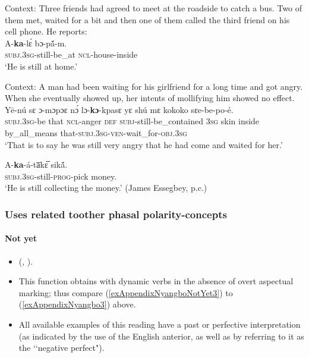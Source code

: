 \begin{exe}
	\ex\label{exAppendixNyangbo1}
	Context: Three friends had agreed to meet at the roadside to catch a bus. Two of them met, waited for a bit and then one of them called the third friend on his cell phone. He reports:\\
	\gll A-\textbf{ka}-lɛ́ bɔ-pã́-m.\\
	\textsc{subj}.3\textsc{sg}-still-be\_at \textsc{ncl}-house-inside\\
	\glt \lq He is still at home.’ \parencite[46]{Essegbey2012}

	\ex\label{exAppendixNyangbo2}
	Context: A man had been waiting for his girlfriend for a long time and got angry. When she eventually showed up, her intents of mollifying him showed no effect. \\
	\gll Yē-nú sɛ ɔ-mɔpɔɛ nɔ́ lɔ-\textbf{kɔ}-kpasɛ yɛ shú mɛ kokoko sɛe-be-po-é.\\
	\textsc{subj}.3\textsc{sg}-be that \textsc{ncl}-anger \textsc{def} \textsc{subj}-still-be\_contained 3\textsc{sg} skin inside by\_all\_means that-\textsc{subj}.3\textsc{sg}-\textsc{ven}-wait\_for-\textsc{obj}.3\textsc{sg}\\
	\glt \lq That is to say he was still very angry that he had come and waited for her.' \parencite[46]{Essegbey2012}

	\ex\label{exAppendixNyangbo3}
	\gll A-\textbf{ka}-á-ta̅kɛ̅ sikã́.\\
	\textsc{subj}.3\textsc{sg}-still-\textsc{prog}-pick money.\\
	\glt \lq He is still collecting the money.' (James Essegbey, p.c.)
\end{exe}

\subsubsection{Uses related toother phasal polarity-concepts}
\paragraph{Not yet}\label{appendixNyangboNotYet}
\begin{itemize}
	\item \citeauthor{Essegbey2012} (\citeyear{Essegbey2012}, \citeyear[159–161]{Essegbey2019}).
	\item This function obtains with dynamic verbs in the absence of overt aspectual marking; thus compare (\ref{exAppendixNyangboNotYet3}) to (\ref{exAppendixNyangbo3}) above.
	\item All available examples of this reading have a past or perfective interpretation (as indicated by the use of the English anterior, as well as by \cite{Essegbey2019} referring to it as the \lq\lq negative perfect").
\end{itemize}

